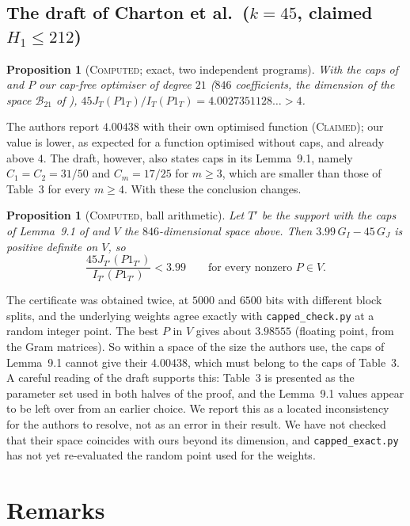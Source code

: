 \documentclass[11pt]{amsart}
\newtheorem{proposition}[theorem]{Proposition}
\theoremstyle{definition}
\theoremstyle{remark}
\newcommand{\lbl}[1]{\textup{\textsc{#1}}}
\begin{document}
\subsection*{The draft of Charton et al.\ ($k=45$, claimed $H_1\le212$)}

\begin{proposition}[\lbl{Computed}; exact, two independent programs]\label{prop:212}
With the caps of \cite[Table~3]{Cha26} and $P$ our cap-free optimiser of
degree $21$ ($846$ coefficients, the dimension of the space
$\mathcal B_{21}$ of \cite[Thm.~11.1]{Cha26}),
$45J_T(P1_T)/I_T(P1_T)=4.0027351128\ldots>4$.
\end{proposition}

The authors report $4.00438$ with their own optimised function (\lbl{Claimed});
our value is lower, as expected for a function optimised without caps, and
already above $4$. The draft, however, also states caps in its Lemma~9.1,
namely $C_1=C_2=31/50$ and $C_m=17/25$ for $m\ge3$, which are smaller than
those of Table~3 for every $m\ge4$. With these the conclusion changes.

\begin{proposition}[\lbl{Computed}, ball arithmetic]\label{prop:ceiling}
Let $T'$ be the support with the caps of Lemma~9.1 of \cite{Cha26} and $V$ the
$846$-dimensional space above. Then $3.99\,G_I-45\,G_J$ is positive definite on
$V$, so
\[
\frac{45J_{T'}(P1_{T'})}{I_{T'}(P1_{T'})}<3.99\qquad\text{for every nonzero }P\in V.
\]
\end{proposition}

The certificate was obtained twice, at $5000$ and $6500$ bits with different
block splits, and the underlying weights agree exactly with
\texttt{capped\_check.py} at a random integer point. The best $P$ in $V$ gives
about $3.98555$ (floating point, from the Gram matrices). So within a space of
the size the authors use, the caps of Lemma~9.1 cannot give their
$4.00438$, which must belong to the caps of Table~3. A careful reading of the
draft supports this: Table~3 is presented as the parameter set used in both
halves of the proof, and the Lemma~9.1 values appear to be left over from an
earlier choice. We report this as a located inconsistency for the authors to
resolve, not as an error in their result. We have not checked that their space
coincides with ours beyond its dimension, and \texttt{capped\_exact.py} has not
yet re-evaluated the random point used for the weights.

\section{Remarks}
\end{document}
